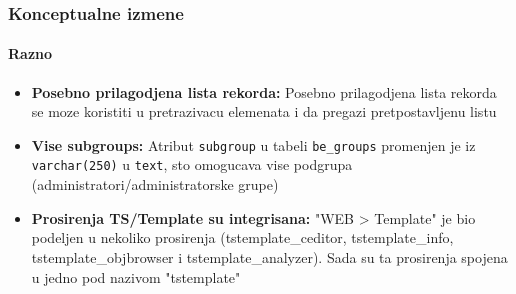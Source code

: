 \begin{frame}[fragile]
	\frametitle{Konceptualne izmene}
	\framesubtitle{Razno}

	\begin{itemize}

		\item \textbf{Posebno prilagodjena lista rekorda:}\newline
			\small
				Posebno prilagodjena lista rekorda se moze koristiti u pretrazivacu elemenata i da pregazi pretpostavljenu listu
			\normalsize

		\item \textbf{Vise subgroups:}\newline
			\small
				Atribut \texttt{subgroup} u tabeli \texttt{be\_groups} promenjen je iz \texttt{varchar(250)} u \texttt{text}, sto omogucava vise podgrupa (administratori/administratorske grupe)
			\normalsize

		\item \textbf{Prosirenja TS/Template su integrisana:}\newline
			\small
				"WEB > Template" je bio podeljen u nekoliko prosirenja (tstemplate\_ceditor, tstemplate\_info, tstemplate\_objbrowser i tstemplate\_analyzer). Sada su ta prosirenja spojena u jedno pod nazivom "tstemplate"
			\normalsize

	\end{itemize}
	
\end{frame}


